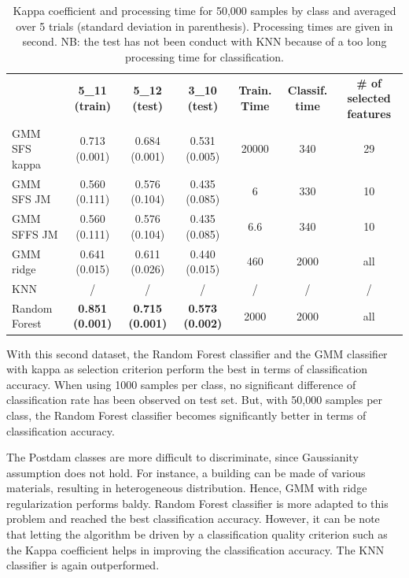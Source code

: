 \documentclass[journal,10pt]{IEEEtran}
\begin{document}
    \begin{table}[!t]
        \centering
        \caption{Kappa coefficient and processing time for 50,000 samples by class and averaged over 5 trials (standard deviation in parenthesis). Processing times are given in second. NB: the test has not been conduct with KNN because of a too long processing time for classification.\label{tab:potsdam-otbsimu-big}}
        \begin{tabular}{lcccccc}\toprule
            & {\bfseries 5\_11 (train)} & {\bfseries 5\_12 (test)} & {\bfseries 3\_10 (test)} & {\bfseries Train. Time} & {\bfseries Classif. time} & {\bfseries \# of selected features} \\ \cmidrule{2-7}
            GMM SFS kappa & 0.713 (0.001) & 0.684 (0.001) & 0.531 (0.005) & 20000 & 340 & 29 \\
            GMM SFS JM &    0.560 (0.111) & 0.576 (0.104) & 0.435 (0.085) & 6 & 330 & 10 \\
            GMM SFFS JM &   0.560 (0.111) & 0.576 (0.104) & 0.435 (0.085) & 6.6 & 340 & 10 \\
            GMM ridge &     0.641 (0.015) & 0.611 (0.026) & 0.440 (0.015) & 460 & 2000 & all \\
            KNN &           /             & /             & /             & / & / & / \\
            Random Forest & {\bfseries 0.851 (0.001)} & {\bfseries 0.715 (0.001)} & {\bfseries 0.573 (0.002)} & 2000 & 2000 & all \\
            \bottomrule
        \end{tabular}
    \end{table}

    With this second dataset, the Random Forest classifier and the GMM classifier with kappa as selection criterion perform the best in terms of classification accuracy. When using 1000 samples per class, no significant difference of classification rate has been observed on test set. But, with 50,000 samples per class, the Random Forest classifier becomes significantly better in terms of classification accuracy.

    The  Postdam classes  are  more difficult  to discriminate,  since
    Gaussianity assumption  does not  hold. For instance,  a building
    can  be  made of  various  materials,  resulting in  heterogeneous
    distribution.   Hence,  GMM  with  ridge  regularization  performs
    baldy. Random  Forest classifier is  more adapted to  this problem
    and reached the  best classification accuracy. However,  it can be
    note  that letting  the algorithm  be driven  by a  classification
    quality criterion such as the Kappa coefficient helps in improving
    the  classification   accuracy.  The   KNN  classifier   is  again
    outperformed.
\end{document}
